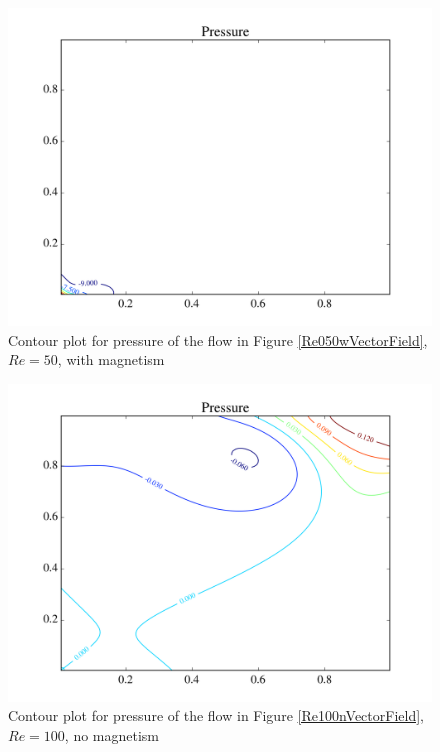 \documentclass[journal]{IEEEtran}
\begin{document}
\begin{figure}[!t]
\centering
\includegraphics[width=\linewidth]{figures/Re050/w/pressure}
\caption{Contour plot for pressure of the flow in Figure \ref{Re050wVectorField}, $\mathit{Re}=50$, with magnetism \label{Re050wPressure}}
\end{figure}



\begin{figure}[!t]
\centering
\includegraphics[width=\linewidth]{figures/Re100/n/pressure}
\caption{Contour plot for pressure of the flow in Figure \ref{Re100nVectorField}, $\mathit{Re}=100$, no magnetism\label{Re100nPressure}}
\end{figure}
\end{document}
